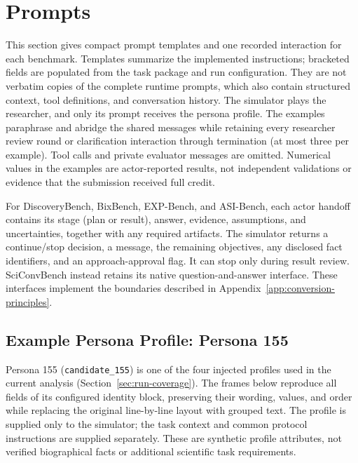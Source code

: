 \newenvironment{promptframe}[1]{%
  \begin{tcolorbox}[enhanced,breakable,
    colback=promptframebackground,colframe=promptframeborder,
    boxrule=0.5pt,arc=0pt,left=9pt,right=9pt,top=6pt,bottom=6pt,
    before skip=8pt,after skip=8pt,
    title={#1},title after break={#1 (continued)},
    colbacktitle=gray!10,coltitle=black,fonttitle=\small\bfseries,
    fontupper=\small,lines before break=4]
  \raggedright\setstretch{1.0}\setlength{\parindent}{0pt}\setlength{\parskip}{4pt}%
}{%
  \end{tcolorbox}%
}

\section{Prompts}
\label{app:prompts}
This section gives compact prompt templates and one recorded interaction for
each benchmark. Templates summarize the implemented instructions; bracketed
fields are populated from the task package and run configuration. They are
not verbatim copies of the complete runtime prompts, which also contain
structured context, tool definitions, and conversation history. The simulator
plays the researcher, and only its prompt receives the persona profile.
The examples paraphrase and abridge the shared messages while retaining every
researcher review round or clarification interaction through termination (at
most three per example). Tool calls and private evaluator messages are
omitted. Numerical values in the examples are actor-reported results, not
independent validations or evidence that the submission received full credit.

For DiscoveryBench, BixBench, EXP-Bench, and ASI-Bench, each actor handoff
contains its stage (plan or result), answer, evidence, assumptions, and
uncertainties, together with any required artifacts. The simulator returns
a continue/stop decision, a message, the remaining objectives, any disclosed
fact identifiers, and an approach-approval flag. It can stop only during
result review. SciConvBench instead retains its native question-and-answer
interface. These interfaces implement the boundaries described in
Appendix~\ref{app:conversion-principles}.

\subsection{Example Persona Profile: Persona 155}
\label{app:persona-profile}
Persona 155 (\texttt{candidate\_155}) is one of the four injected profiles
used in the current analysis (Section~\ref{sec:run-coverage}). The frames
below reproduce all fields of its configured identity block, preserving
their wording, values, and order while replacing the original line-by-line
layout with grouped text. The profile is supplied only to the simulator;
the task context and common protocol instructions are supplied separately.
These are synthetic profile attributes, not verified biographical facts or
additional scientific task requirements.

